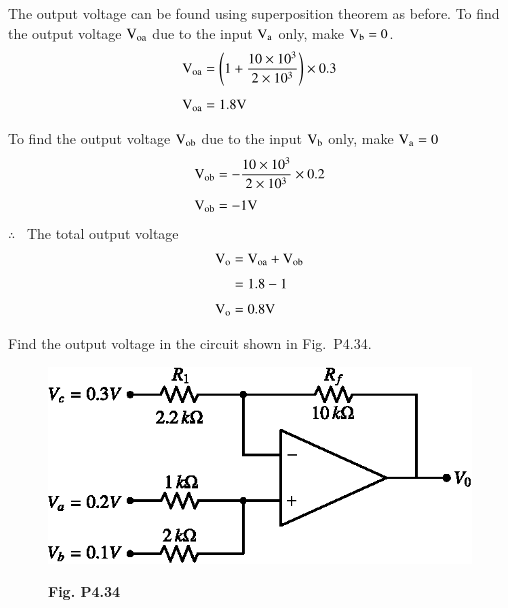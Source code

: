 \begin{solution}
The output voltage can be found using superposition theorem as before. To find the output voltage $\textrm{V}_{\textrm{o}\textrm{a}}$ due to the input $\textrm{V}_{\textrm{a}}$ only, make $\textrm{V}_{\textrm{b}}=0$.
\begin{align*}
\textrm{V}_{\textrm{o}\textrm{a}} &= \left(1+\frac{10\times 10^{3}}{2\times 10^{3}}\right)\times 0.3\\[4pt]
\textrm{V}_{\textrm{o}\textrm{a}} &= 1.8\textrm{V}
\end{align*}

To find the output voltage $\textrm{V}_{\textrm{o}\textrm{b}}$ due to the input $\textrm{V}_{\textrm{b}}$ only, make $\textrm{V}_{\textrm{a}}=0$
\begin{align*}
\textrm{V}_{\textrm{o}\textrm{b}} &= -\frac{10\times 10^{3}}{2\times 10^{3}}\times 0.2\\[3pt]
\textrm{V}_{\textrm{o}\textrm{b}} &= -1\textrm{V}
\end{align*}
$\therefore$~ The total output voltage 
\begin{align*}
\textrm{V}_{\textrm{o}} &= \textrm{V}_{\textrm{o}\textrm{a}}+\textrm{V}_{\textrm{o}\textrm{b}}\\[3pt]
&= 1.8-1\\[3pt]
\textrm{V}_{\textrm{o}} &= 0.8\textrm{V}
\end{align*}
\end{solution}

\eject

\begin{problem}\label{prob4.34}
Find the output voltage in the circuit shown in Fig.~P4.34.
\begin{figure}[H]
\centering
\includegraphics[scale=.96]{chap4/figP4.33.eps}

\smallskip
{\bf Fig. P4.34}
\end{figure}
\end{problem}


